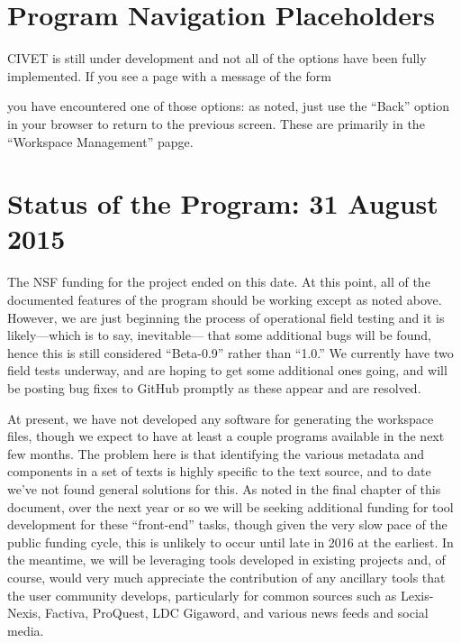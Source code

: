 \documentclass[letterpaper,10pt,english]{sphinxmanual}
\begin{document}
\section{Program Navigation Placeholders}
\label{intro:program-navigation-placeholders}
CIVET is still under development and not all of the options have
been fully implemented. If you see a page with a message of the form
\begin{quote}

\end{quote}

you have encountered one of those options: as noted, just use the “Back”
option in your browser to return to the previous screen. These are primarily
in the “Workspace Management” papge.


\section{Status of the Program: 31 August 2015}
\label{intro:status-of-the-program-31-august-2015}
The NSF funding for the project ended on this date. At this point, all of
the documented features of the program should be working except as
noted above. However, we are just beginning the process of
operational field testing and it is likely—which is to say, inevitable—
that some additional bugs will be found, hence this is still considered
“Beta-0.9” rather than “1.0.” We currently have two field tests underway,
and are hoping to get some additional ones going, and will be posting
bug fixes to GitHub promptly as these appear and are resolved.

At present, we have not developed any software for generating the
workspace files, though we expect to have at least a couple programs
available in the next few months. The problem here is that identifying
the various metadata and components in a set of texts is highly
specific to the text source, and to date we've not found general
solutions for this. As noted in the final chapter of this document,
over the next year or so we will be seeking additional funding for
tool development for these “front-end” tasks, though given the very
slow pace of the public funding cycle, this is unlikely to occur until
late in 2016 at the earliest. In the meantime, we will be leveraging
tools developed in existing projects and, of course, would very
much appreciate the contribution of any ancillary tools that the user
community develops, particularly for common sources such as Lexis-Nexis,
Factiva, ProQuest, LDC Gigaword, and various news feeds and social
media.
\end{document}
